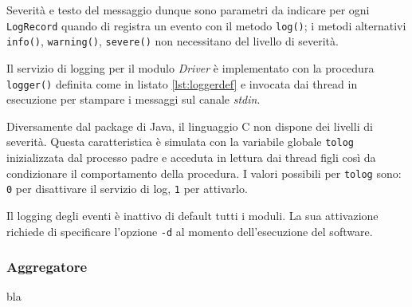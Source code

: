 Severità e testo del messaggio dunque sono parametri da indicare per ogni
\texttt{LogRecord} quando di registra un evento con il metodo \texttt{log()};
i metodi alternativi \texttt{info()}, \texttt{warning()}, \texttt{severe()} non
necessitano del livello di severità.

\vspace{5mm}

Il servizio di logging per il modulo \textit{Driver} è implementato con la
procedura \texttt{logger()} definita come in listato \ref{lst:loggerdef} e
invocata dai thread in esecuzione per stampare i messaggi sul canale
\textit{stdin}.

\vspace{5mm}



Diversamente dal package di Java, il linguaggio C non dispone dei livelli di
severità. Questa caratteristica è simulata con la variabile globale
\texttt{tolog} inizializzata dal processo padre e acceduta in lettura dai thread
figli così da condizionare il comportamento della procedura. I valori possibili
per \texttt{tolog} sono: \texttt{0} per disattivare il servizio di log,
\texttt{1} per attivarlo.

\vspace{5mm}
 
Il logging degli eventi è inattivo di default tutti i moduli. La sua attivazione
richiede di specificare l'opzione \texttt{-d} al momento dell'esecuzione del software.
\subsubsection{Aggregatore}
bla
\newpage